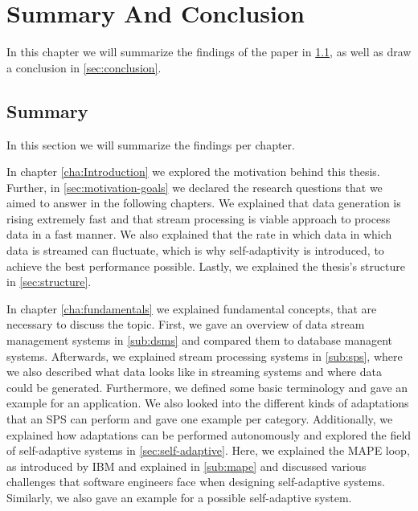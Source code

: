 \chapter{Summary And Conclusion}
In this chapter we will summarize the findings of the paper in \ref{sec:summary}, as well as draw a conclusion in \ref{sec:conclusion}.
\label{cha:summary}
\section{Summary}
\label{sec:summary}
In this section we will summarize the findings per chapter.

\quad In chapter \ref{cha:Introduction} we explored the motivation behind this thesis. 
Further, in \ref{sec:motivation-goals} we declared the research questions that we aimed to answer in the following chapters.
We explained that data generation is rising extremely fast and that stream processing is viable approach to process data in a fast manner. 
We also explained that the rate in which data in which data is streamed can fluctuate, which is why self-adaptivity is introduced, to achieve the best performance possible.
Lastly, we explained the thesis's structure in \ref{sec:structure}.

\quad In chapter \ref{cha:fundamentals} we explained fundamental concepts, that are necessary to discuss the topic. 
First, we gave an overview of data stream management systems in \ref{sub:dsms} and compared them to database managent systems. 
Afterwards, we explained stream processing systems in \ref{sub:sps}, where we also described what data looks like in streaming systems and where data could be generated. 
Furthermore, we defined some basic terminology and gave an example for an application.
We also looked into the different kinds of adaptations that an SPS can perform and gave one example per category. 
Additionally, we explained how adaptations can be performed autonomously and explored the field of self-adaptive systems in \ref{sec:self-adaptive}.
Here, we explained the MAPE loop, as introduced by IBM and explained in \ref{sub:mape} and discussed various 
challenges that software engineers face when designing self-adaptive systems.
Similarly, we also gave an example for a possible self-adaptive system.

